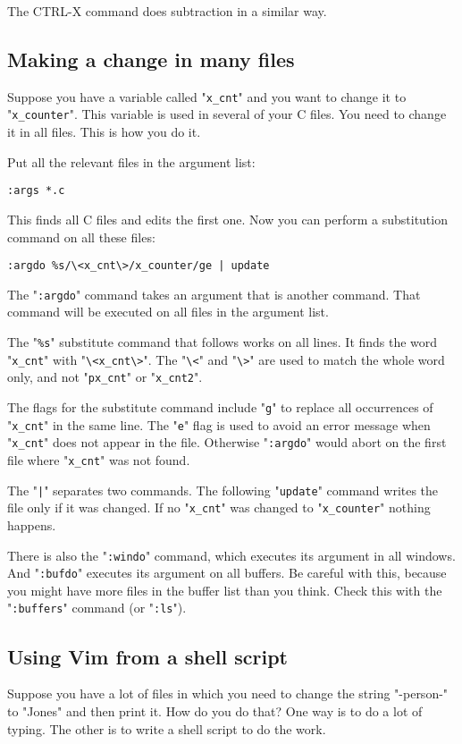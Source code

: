 The CTRL-X command does subtraction in a similar way.
\subsection{Making a change in many files}
Suppose you have a variable called "\texttt{x\_cnt}" and you want to change it to "\texttt{x\_counter}".
This variable is used in several of your C files.
You need to change it in all files.
This is how you do it.

Put all the relevant files in the argument list:

\begin{Verbatim}[samepage=true]
 :args *.c
\end{Verbatim}
 
This finds all C files and edits the first one.
Now you can perform a substitution command on all these files:

\begin{Verbatim}[samepage=true]
 :argdo %s/\<x_cnt\>/x_counter/ge | update
\end{Verbatim}

The "\texttt{:argdo}" command takes an argument that is another command.
That command will be executed on all files in the argument list.

The "\texttt{\%s}" substitute command that follows works on all lines.
It finds the word "\texttt{x\_cnt}" with "\texttt{\textbackslash<x\_cnt\textbackslash>}".
The "\texttt{\textbackslash<}" and "\texttt{\textbackslash>}" are used to match the whole word only, and not "\texttt{px\_cnt}" or "\texttt{x\_cnt2}".

The flags for the substitute command include "\texttt{g}" to replace all occurrences of "\texttt{x\_cnt}" in the same line.
The "\texttt{e}" flag is used to avoid an error message when "\texttt{x\_cnt}" does not appear in the file.
Otherwise "\texttt{:argdo}" would abort on the first file where "\texttt{x\_cnt}" was not found.

The "\texttt{|}" separates two commands.
The following "\texttt{update}" command writes the file only if it was changed.
If no "\texttt{x\_cnt}" was changed to "\texttt{x\_counter}" nothing happens.

There is also the "\texttt{:windo}" command, which executes its argument in all windows.
And "\texttt{:bufdo}" executes its argument on all buffers.
Be careful with this, because you might have more files in the buffer list than you think.
Check this with the "\texttt{:buffers}" command (or "\texttt{:ls}").
\subsection{Using Vim from a shell script}
Suppose you have a lot of files in which you need to change the string "-person-" to "Jones" and then print it.
How do you do that?  One way is to do a lot of typing.
The other is to write a shell script to do the work.

